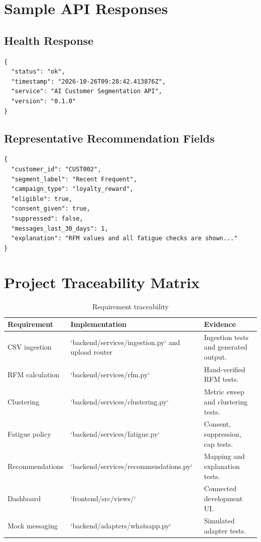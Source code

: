 \documentclass[12pt,a4paper]{report}
\begin{document}
\appendix
\chapter{Sample API Responses}
\section{Health Response}
\begin{lstlisting}
{
  "status": "ok",
  "timestamp": "2026-10-26T09:28:42.413876Z",
  "service": "AI Customer Segmentation API",
  "version": "0.1.0"
}
\end{lstlisting}

\section{Representative Recommendation Fields}
\begin{lstlisting}
{
  "customer_id": "CUST002",
  "segment_label": "Recent Frequent",
  "campaign_type": "loyalty_reward",
  "eligible": true,
  "consent_given": true,
  "suppressed": false,
  "messages_last_30_days": 1,
  "explanation": "RFM values and all fatigue checks are shown..."
}
\end{lstlisting}

\chapter{Project Traceability Matrix}
\begin{longtable}{p{}p{}p{}}
\caption{Requirement traceability}\label{tab:traceability}\\
\toprule
Requirement & Implementation & Evidence\\\midrule
CSV ingestion & `backend/services/ingestion.py` and upload router & Ingestion tests and generated output.\\
RFM calculation & `backend/services/rfm.py` & Hand-verified RFM tests.\\
Clustering & `backend/services/clustering.py` & Metric sweep and clustering tests.\\
Fatigue policy & `backend/services/fatigue.py` & Consent, suppression, cap tests.\\
Recommendations & `backend/services/recommendations.py` & Mapping and explanation tests.\\
Dashboard & `frontend/src/views/` & Connected development UI.\\
Mock messaging & `backend/adapters/whatsapp.py` & Simulated adapter tests.\\
\bottomrule
\end{longtable}
\end{document}
